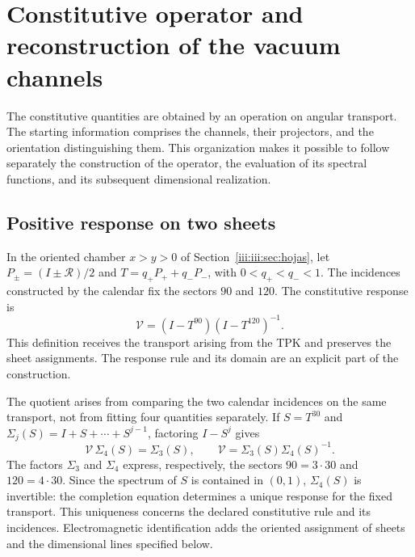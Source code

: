 \section{Constitutive operator and reconstruction of the vacuum channels}
\label{iii:iii:sec:constitutiva}

The constitutive quantities are obtained by an operation on angular
transport. The starting information comprises the channels, their
projectors, and the orientation distinguishing them. This organization makes it possible
to follow separately the construction of the operator, the evaluation of its
spectral functions, and its subsequent dimensional realization.

\subsection{Positive response on two sheets}

In the oriented chamber $x>y>0$ of Section~\ref{iii:iii:sec:hojas}, let
$P_\pm=(I\pm\mathcal R)/2$ and
$T=q_+P_++q_-P_-$, with $0<q_+<q_-<1$. The incidences constructed by the
calendar fix the sectors $90$ and $120$. The constitutive response is
\begin{equation}
 \mathcal V=(I-T^{90})(I-T^{120})^{-1}.
 \label{iii:iii:eq:vacuum-op}
\end{equation}
This definition receives the transport arising from the TPK and preserves the
sheet assignments. The response rule and its domain are an explicit part
of the construction.

The quotient arises from comparing the two calendar incidences on
the same transport, not from fitting four quantities separately. If
$S=T^{30}$ and $\Sigma_j(S)=I+S+\cdots+S^{j-1}$, factoring
$I-S^j$ gives
\begin{equation}
 \mathcal V\,\Sigma_4(S)=\Sigma_3(S),\qquad
 \mathcal V=\Sigma_3(S)\Sigma_4(S)^{-1}.
 \label{iii:iii:eq:completion-response}
\end{equation}
The factors $\Sigma_3$ and $\Sigma_4$ express, respectively, the
sectors $90=3\cdot30$ and $120=4\cdot30$. Since the spectrum of $S$ is
contained in $(0,1)$, $\Sigma_4(S)$ is invertible: the completion
equation determines a unique response for the fixed transport.
This uniqueness concerns the declared constitutive rule and its
incidences. Electromagnetic identification adds the oriented
assignment of sheets and the dimensional lines specified
below.


